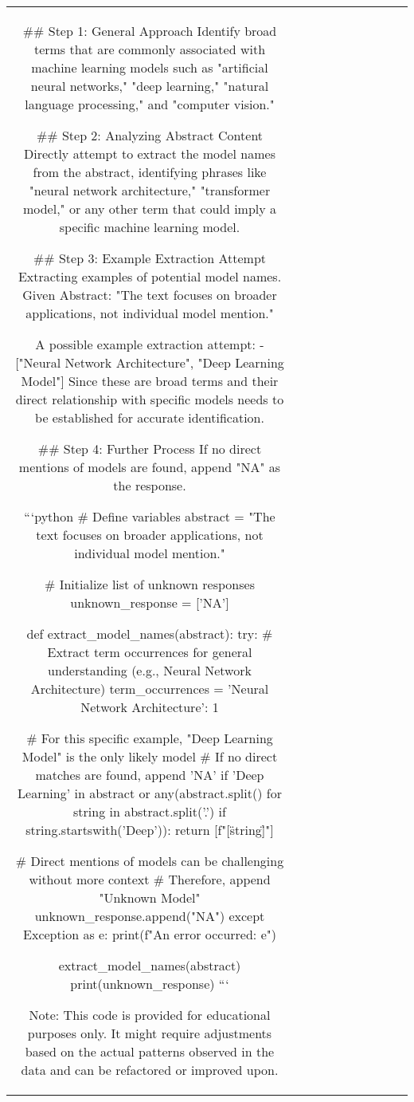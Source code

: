 \begin{table}[h!]
\begin{tabular}{|c|c|c|c|c|c|c|c|c|c|}
## Step 1: General Approach
Identify broad terms that are commonly associated with machine learning models such as "artificial neural networks," "deep learning," "natural language processing," and "computer vision."

## Step 2: Analyzing Abstract Content
Directly attempt to extract the model names from the abstract, identifying phrases like "neural network architecture," "transformer model," or any other term that could imply a specific machine learning model.

## Step 3: Example Extraction Attempt
Extracting examples of potential model names. Given Abstract:
"The text focuses on broader applications, not individual model mention."

A possible example extraction attempt:
- ["Neural Network Architecture", "Deep Learning Model"]
Since these are broad terms and their direct relationship with specific models needs to be established for accurate identification.

## Step 4: Further Process
If no direct mentions of models are found, append "NA" as the response.

```python
# Define variables
abstract = "The text focuses on broader applications, not individual model mention."

# Initialize list of unknown responses
unknown_response = ['NA']

def extract_model_names(abstract):
    try:
        # Extract term occurrences for general understanding (e.g., Neural Network Architecture)
        term_occurrences = {'Neural Network Architecture': 1}
        
        # For this specific example, "Deep Learning Model" is the only likely model
        # If no direct matches are found, append 'NA'
        if 'Deep Learning' in abstract or any(abstract.split() for string in abstract.split('.') if string.startswith('Deep')):
            return [f"[\"{string}\"]"]
        
        # Direct mentions of models can be challenging without more context
        # Therefore, append "Unknown Model"
        unknown_response.append("NA")
    except Exception as e:
        print(f"An error occurred: {e}")

extract_model_names(abstract)
print(unknown_response)
```

Note: This code is provided for educational purposes only. It might require adjustments based on the actual patterns observed in the data and can be refactored or improved upon.


\end{tabular}
\end{table}
